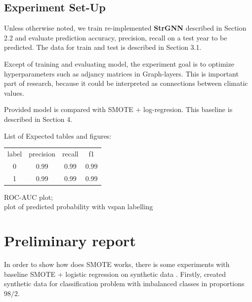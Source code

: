 \documentclass{article}
\begin{document}
\subsection{Experiment Set-Up}
Unless otherwise noted, we train re-implemented \textbf{StrGNN} described in Section 2.2 and evaluate prediction accuracy, precision, recall on a test year to be predicted. The data for train and test is described in Section 3.1.

Except of training and evaluating model, the experiment goal is to optimize hyperparameters such as adjancy matrices in Graph-layers. This is important part of research, because it could be interpreted as connections between climatic values. 

Provided model is compared with SMOTE + log-regresion. This baseline is described in Section 4.

List of Expected tables and figures:

\begin{tabular}{c|c|c|c}
    label & precision & recall & f1 \\
    0 & 0.99 & 0.99 & 0.99 \\
    1 & 0.99 & 0.99 & 0.99
\end{tabular}

ROC-AUC plot;\\
plot of predicted probability with vspan labelling\\
\section{Preliminary report}
In order to show how does SMOTE works, there is some experiments with baseline SMOTE + logistic regression on synthetic data . Firstly, created synthetic data for classification problem with imbalanced classes in proportions $98/2$.
\end{document}
